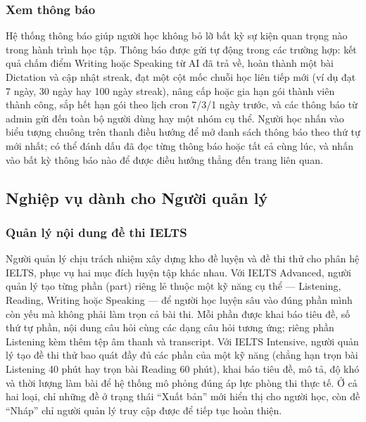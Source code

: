 \subsubsection{Xem thông báo}

Hệ thống thông báo giúp người học không bỏ lỡ bất kỳ sự kiện quan trọng nào trong hành trình học tập. Thông báo được gửi tự động trong các trường hợp: kết quả chấm điểm Writing hoặc Speaking từ AI đã trả về, hoàn thành một bài Dictation và cập nhật streak, đạt một cột mốc chuỗi học liên tiếp mới (ví dụ đạt 7 ngày, 30 ngày hay 100 ngày streak), nâng cấp hoặc gia hạn gói thành viên thành công, sắp hết hạn gói theo lịch cron 7/3/1 ngày trước, và các thông báo từ admin gửi đến toàn bộ người dùng hay một nhóm cụ thể. Người học nhấn vào biểu tượng chuông trên thanh điều hướng để mở danh sách thông báo theo thứ tự mới nhất; có thể đánh dấu đã đọc từng thông báo hoặc tất cả cùng lúc, và nhấn vào bất kỳ thông báo nào để được điều hướng thẳng đến trang liên quan.

\subsection{Nghiệp vụ dành cho Người quản lý}

\subsubsection{Quản lý nội dung đề thi IELTS}

Người quản lý chịu trách nhiệm xây dựng kho đề luyện và đề thi thử cho phân hệ IELTS, phục vụ hai mục đích luyện tập khác nhau. Với IELTS Advanced, người quản lý tạo từng phần (part) riêng lẻ thuộc một kỹ năng cụ thể --- Listening, Reading, Writing hoặc Speaking --- để người học luyện sâu vào đúng phần mình còn yếu mà không phải làm trọn cả bài thi. Mỗi phần được khai báo tiêu đề, số thứ tự phần, nội dung câu hỏi cùng các dạng câu hỏi tương ứng; riêng phần Listening kèm thêm tệp âm thanh và transcript. Với IELTS Intensive, người quản lý tạo đề thi thử bao quát đầy đủ các phần của một kỹ năng (chẳng hạn trọn bài Listening 40 phút hay trọn bài Reading 60 phút), khai báo tiêu đề, mô tả, độ khó và thời lượng làm bài để hệ thống mô phỏng đúng áp lực phòng thi thực tế. Ở cả hai loại, chỉ những đề ở trạng thái ``Xuất bản'' mới hiển thị cho người học, còn đề ``Nháp'' chỉ người quản lý truy cập được để tiếp tục hoàn thiện.

